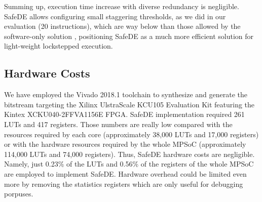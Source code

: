 Summing up, execution time increase with diverse redundancy is negligible. SafeDE allows configuring small staggering thresholds, as we did in our evaluation (20 instructions), which are way below than those allowed by the software-only solution \cite{alcaide2020software}, positioning SafeDE as a much more efficient solution for light-weight lockstepped execution. 


\bigskip

\subsection{Hardware Costs}
\label{section:Hardware_resources}

We have employed the Vivado 2018.1 toolchain to synthesize and generate the bitstream targeting the Xilinx UlstraScale KCU105 Evaluation Kit featuring the Kintex XCKU040-2FFVA1156E FPGA. SafeDE implementation required 261 LUTs and 417 registers. Those numbers are really low compared with the resources required by each core (approximately 38,000 LUTs and 17,000 registers) or with the hardware resources required by the whole MPSoC (approximately 114,000 LUTs and 74,000 registers). Thus, SafeDE hardware costs are negligible. Namely, just 0.23\% of the LUTs and 0.56\% of the registers of the whole MPSoC are employed to implement SafeDE. Hardware overhead could be limited even more by removing the statistics registers which are only useful for debugging porpuses.


\bigskip


